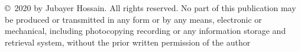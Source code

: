 \thispagestyle{empty}
\null\vfill
\noindent\copyright~2020 by Jubayer Hossain. All rights reserved. No part of this publication may be produced or transmitted in any form or by any means, electronic or mechanical, including photocopying recording or any information storage and retrieval system, without the prior written permission of the author 

